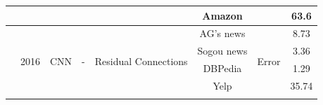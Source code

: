 \documentclass[12pt, a4paper, oneside]{report}
\begin{document}
\begin{tiny}
\begin{latin}
\begin{longtable}{|c|c|c|c|c|c|cc|}
                                                                              &                       &                                   &                                         &                                                                                                        & Amazon                                & \multicolumn{1}{c|}{}                                                                                                              & 63.6   \\ \hline
        \multirow{6}{*}{\cite{conneau2016very}}              & \multirow{6}{*}{2016} & \multirow{6}{*}{CNN}              & \multirow{6}{*}{-}                      & \multirow{6}{*}{Residual Connections}                                                                  & AG’s news                             & \multicolumn{1}{c|}{\multirow{6}{*}{Error}}                                                                                        & 8.73   \\ \cline{6-6} \cline{8-8} 
                                                                              &                       &                                   &                                         &                                                                                                        & Sogou news                            & \multicolumn{1}{c|}{}                                                                                                              & 3.36   \\ \cline{6-6} \cline{8-8} 
                                                                              &                       &                                   &                                         &                                                                                                        & DBPedia                               & \multicolumn{1}{c|}{}                                                                                                              & 1.29   \\ \cline{6-6} \cline{8-8} 
                                                                              &                       &                                   &                                         &                                                                                                        & Yelp                                  & \multicolumn{1}{c|}{}                                                                                                              & 35.74  \\ \cline{6-6} \cline{8-8} 

\end{longtable}
\end{latin}
\end{tiny}
\end{document}
